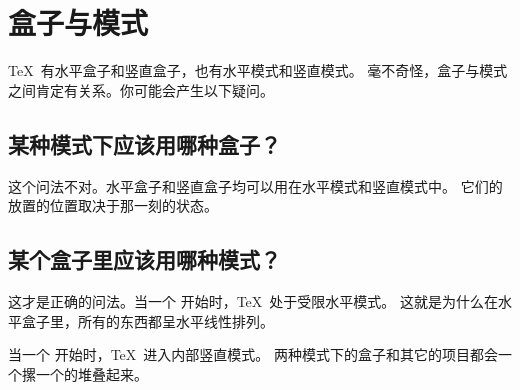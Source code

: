 \documentclass{book}
\begin{document}
\section{盒子与模式}
\label{hvbox}

\TeX\ 有水平盒子和竖直盒子，也有水平模式和竖直模式。
毫不奇怪，盒子与模式之间肯定有关系。你可能会产生以下疑问。

\subsection{某种模式下应该用哪种盒子？}

这个问法不对。水平盒子和竖直盒子均可以用在水平模式和竖直模式中。
它们的放置的位置取决于那一刻的状态。

\subsection{某个盒子里应该用哪种模式？}

这才是正确的问法。当一个  开始时，\TeX\ 处于受限水平模式。
这就是为什么在水平盒子里，所有的东西都呈水平线性排列。

当一个  开始时，\TeX\ 进入内部竖直模式。
两种模式下的盒子和其它的项目都会一个摞一个的堆叠起来。


\end{document}
